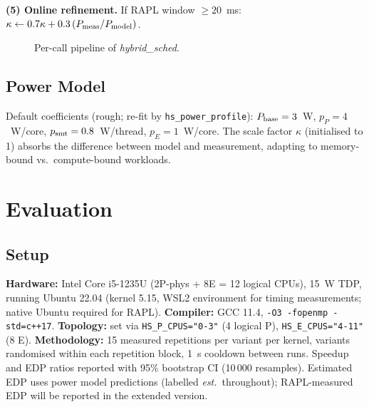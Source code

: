 \documentclass[conference]{IEEEtran}
\begin{document}
\textbf{(5) Online refinement.}
If RAPL window $\geq 20$~ms:
$\kappa \leftarrow 0.7\kappa + 0.3\,(P_{\rm meas}/P_{\rm model})$.

\begin{figure}[t]
\centering
{}
\caption{Per-call pipeline of \textit{hybrid\_sched}.}
\label{fig:flow}
\end{figure}

\subsection{Power Model}

Default coefficients (rough; re-fit by \texttt{hs\_power\_profile}):
$P_{\rm base}=3$~W, $p_P=4$~W/core, $p_{\rm smt}=0.8$~W/thread,
$p_E=1$~W/core.
The scale factor $\kappa$ (initialised to 1) absorbs the difference
between model and measurement, adapting to memory-bound vs.\
compute-bound workloads.

\section{Evaluation}

\subsection{Setup}

\textbf{Hardware:} Intel Core i5-1235U (2P-phys + 8E = 12 logical CPUs),
15~W TDP, running Ubuntu 22.04 (kernel 5.15, WSL2 environment for timing
measurements; native Ubuntu required for RAPL).
\textbf{Compiler:} GCC 11.4, \texttt{-O3 -fopenmp -std=c++17}.
\textbf{Topology:} set via \texttt{HS\_P\_CPUS="0-3"} (4 logical P),
\texttt{HS\_E\_CPUS="4-11"} (8 E).
\textbf{Methodology:} 15 measured repetitions per variant per kernel,
variants randomised within each repetition block, 1~s cooldown between
runs. Speedup and EDP ratios reported with 95\% bootstrap CI
(10\,000 resamples). Estimated EDP uses power model predictions
(labelled \textit{est.}\ throughout); RAPL-measured EDP will be
reported in the extended version.
\end{document}
